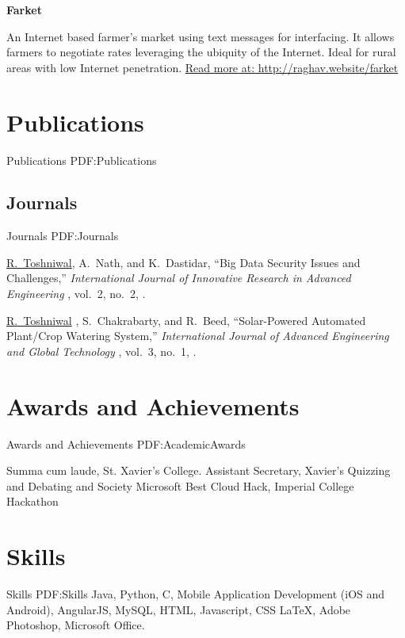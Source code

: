 \documentclass[letterpaper,10pt,oneside]{article}
\newcommand{\CVNote}{Compiled using {\LaTeX}}
\begin{document}
\begin{body}
\GapNoBreak
{\textbf{Farket}}
\hfill
{}
\begin{detail}
An Internet based farmer's market using text messages for interfacing. It allows farmers to negotiate rates leveraging the ubiquity of the Internet. 
\newline
Ideal for rural areas with low Internet penetration.
\newline
\href{http://raghav.website/farket}{Read more at: http://raghav.website/farket}
\end{detail}

\GapNoBreak



\section
{Publications}
{Publications}
{PDF:Publications}

\subsection
{Journals}
{Journals}
{PDF:Journals}

\GapNoBreak

{\underline{R.~Toshniwal}, A.~Nath, and K.~Dastidar,
``Big Data Security Issues and Challenges,''
\textit{International Journal of Innovative Research in Advanced Engineering },
vol.~2,
no.~2,
.}

\Gap

{\underline{R.~Toshniwal} , S.~Chakrabarty, and R.~Beed,
``Solar-Powered Automated Plant/Crop Watering
System,''
\textit{International Journal of Advanced Engineering and Global Technology },
vol.~3,
no.~1,
.}



\section
{Awards and \newline Achievements}
{Awards and \newline Achievements}
{PDF:AcademicAwards}

\BulletItem
Summa cum laude,
St. Xavier's College.
\hfill
{}
\BulletItem
Assistant Secretary,
Xavier’s Quizzing and Debating and Society
\hfill
{}
\BulletItem
Microsoft Best Cloud Hack,
Imperial College Hackathon
\hfill
{}

\section
{Skills}
{Skills}
{PDF:Skills}
Java,
Python,
C,
Mobile Application Development (iOS and Android),
AngularJS,
MySQL,
HTML, Javascript, CSS
{\LaTeX},
Adobe Photoshop,
Microsoft Office.


\begin{flushright}
\UseNoteFont%
[\textit{\CVNote}]%
\hspace{1.0mm}\null
\end{flushright}
\end{body}
\end{document}
